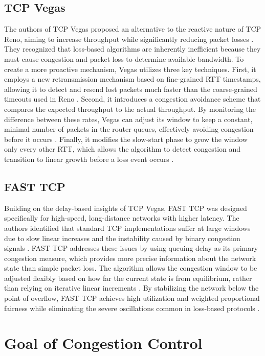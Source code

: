 \documentclass[conference]{IEEEtran}
\begin{document}
\subsection{TCP Vegas}

The authors of TCP Vegas proposed an alternative to the reactive nature of TCP Reno, aiming to increase throughput while significantly reducing packet losses \cite{TCPVEGAS}. 
They recognized that loss-based algorithms are inherently inefficient because they must cause congestion and packet loss to determine available bandwidth. To create a more proactive mechanism, Vegas utilizes three key techniques. 
First, it employs a new retransmission mechanism based on fine-grained RTT timestamps, allowing it to detect and resend lost packets much faster than the coarse-grained timeouts used in Reno \cite{TCPVEGAS}. 
Second, it introduces a congestion avoidance scheme that compares the expected throughput to the actual throughput. 
By monitoring the difference between these rates, Vegas can adjust its window to keep a constant, minimal number of packets in the router queues, effectively avoiding congestion before it occurs \cite{TCPVEGAS}. 
Finally, it modifies the slow-start phase to grow the window only every other RTT, which allows the algorithm to detect congestion and transition to linear growth before a loss event occurs \cite{TCPVEGAS}.

\subsection{FAST TCP}

Building on the delay-based insights of TCP Vegas, FAST TCP was designed specifically for high-speed, long-distance networks with higher latency. 
The authors identified that standard TCP implementations suffer at large windows due to slow linear increases and the instability caused by binary congestion signals \cite{FASTTCP}. 
FAST TCP addresses these issues by using queuing delay as its primary congestion measure, which provides more precise information about the network state than simple packet loss. 
The algorithm allows the congestion window to be adjusted flexibly based on how far the current state is from equilibrium, rather than relying on iterative linear increments \cite{FASTTCP}. 
By stabilizing the network below the point of overflow, FAST TCP achieves high utilization and weighted proportional fairness while eliminating the severe oscillations common in loss-based protocols \cite{FASTTCP}. 
\section{Goal of Congestion Control}\label{sec:Goal}
\end{document}
